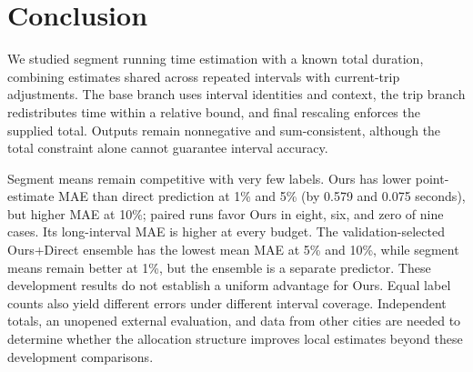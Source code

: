 \section{Conclusion}
We studied segment running time estimation with a known total duration, combining estimates shared across repeated intervals with current-trip adjustments. The base branch uses interval identities and context, the trip branch redistributes time within a relative bound, and final rescaling enforces the supplied total. Outputs remain nonnegative and sum-consistent, although the total constraint alone cannot guarantee interval accuracy.

Segment means remain competitive with very few labels. Ours has lower point-estimate MAE than direct prediction at 1\% and 5\% (by 0.579 and 0.075 seconds), but higher MAE at 10\%; paired runs favor Ours in eight, six, and zero of nine cases. Its long-interval MAE is higher at every budget. The validation-selected Ours+Direct ensemble has the lowest mean MAE at 5\% and 10\%, while segment means remain better at 1\%, but the ensemble is a separate predictor. These development results do not establish a uniform advantage for Ours. Equal label counts also yield different errors under different interval coverage. Independent totals, an unopened external evaluation, and data from other cities are needed to determine whether the allocation structure improves local estimates beyond these development comparisons.
